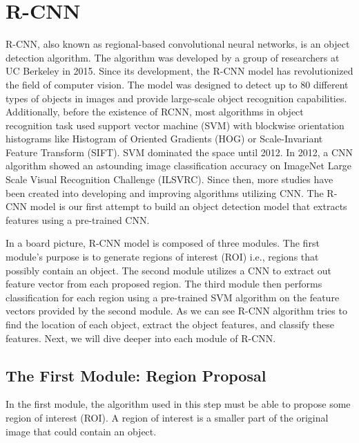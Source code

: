 \section{R-CNN}

R-CNN, also known as regional-based convolutional neural networks, is an object detection algorithm. The algorithm was developed by a group of researchers at UC Berkeley in 2015. Since its development, the R-CNN model has revolutionized the field of computer vision. The model was designed to detect up to 80 different types of objects in images and provide large-scale object recognition capabilities. Additionally, before the existence of RCNN, most algorithms in object recognition task used support vector machine (SVM) with blockwise orientation histograms like Histogram of Oriented Gradients (HOG) or Scale-Invariant Feature Transform (SIFT). SVM dominated the space until 2012. In 2012, a CNN algorithm showed an astounding image classification accuracy on ImageNet Large Scale Visual Recognition Challenge (ILSVRC). Since then, more studies have been created into developing and improving algorithms utilizing CNN. The R-CNN model is our first attempt to build an object detection model that extracts features using a pre-trained CNN.

In a board picture, R-CNN model is composed of three modules. The first module's purpose is to generate regions of interest (ROI) i.e., regions that possibly contain an object. The second module utilizes a CNN to extract out feature vector from each proposed region. The third module then performs classification for each region using a pre-trained SVM algorithm on the feature vectors provided by the second module. As we can see R-CNN algorithm tries to find the location of each object, extract the object features, and classify these features. Next, we will dive deeper into each module of R-CNN.

\subsection{The First Module: Region Proposal}
In the first module, the algorithm used in this step must be able to propose some region of interest (ROI). A region of interest is a smaller part of the original image that could contain an object.

